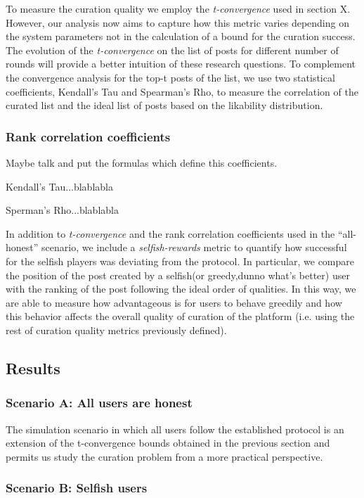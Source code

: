 To measure the curation quality we employ the \textit{t-convergence} used in section X. However, our analysis now aims to capture how this metric varies depending on the system parameters not in the calculation of a bound for the curation success.
The evolution of the \textit{t-convergence} on the list of posts for different number of rounds will provide a better intuition of these research questions.
To complement the convergence analysis for the top-t posts of the list, we use two statistical coefficients, Kendall's Tau and Spearman's Rho, to measure the correlation of the curated list and the ideal list of posts based on the likability distribution.

\subsubsection*{Rank correlation coefficients}
Maybe talk and put the formulas which define this coefficients.

Kendall's Tau...blablabla

Sperman's Rho...blablabla

In addition to \textit{t-convergence} and the rank correlation coefficients used in the ``all-honest'' scenario, we include a \textit{selfish-rewards} metric to quantify how successful for the selfish players was deviating from the protocol. 
In particular, we compare the position of the post created by a selfish(or greedy,dunno what's better) user with the ranking of the post following the ideal order of qualities. In this way, we are able to measure how advantageous is for users to behave greedily and how this behavior affects the overall quality of curation of the platform (i.e. using the rest of curation quality metrics previously defined).


\subsection{Results}

\subsubsection*{Scenario A: All users are honest}

The simulation scenario in which all users follow the established protocol is an extension of the t-convergence bounds obtained in the previous section and permits us study the curation problem from a more practical perspective.


\subsubsection{Scenario B: Selfish users}